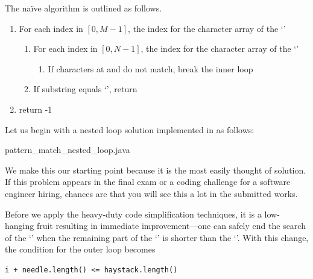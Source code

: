 The naïve algorithm is outlined as follows.
\begin{alisting}
\caption{\label{alg:string-search-naive-algorithm}
A naïve algorithm for string search whose runtime complexity is $O(MN)$ where $M$ and $N$ are
the string lengths.}
\begin{enumerate}
\item For each index  in $[0, M-1]$, the index for the character array of
the `'
\begin{enumerate}
\item For each index  in $[0, N-1]$, the index for the
character array of the `'
\begin{enumerate}
\item If characters at  and  do not match, break the inner loop
\end{enumerate}
\item If substring  equals `', return 
\end{enumerate}
\item return -1
\end{enumerate}
\end{alisting}


Let us begin with a nested loop solution implemented in \java as follows:
\begin{clisting}

{pattern_match_nested_loop.java}
\end{clisting}
We make this our starting point because it is the most easily thought of solution.
If this problem appears in the final exam or a coding challenge for a software engineer hiring,
chances are that you will see this a lot in the submitted works.


Before we apply the heavy-duty code simplification techniques,
it is a low-hanging fruit resulting in immediate improvement---one can safely end the search of the
`' when the remaining part of the `' is shorter than the `'.
With this change, the condition for the outer loop becomes
\begin{lstlisting}
i + needle.length() <= haystack.length()
\end{lstlisting}



